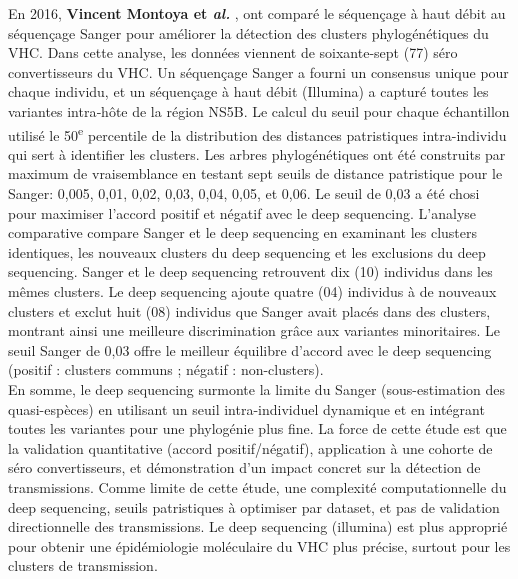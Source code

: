 \documentclass[a4paper,12pt]{article}
\begin{document}
En 2016, \textbf{Vincent Montoya et \textit{al.}} \cite{montoyaDeepSequencingIncreases2016}, ont comparé le séquençage à haut débit au séquençage Sanger pour améliorer la détection des clusters phylogénétiques du VHC. Dans cette analyse, les données viennent de soixante-sept (77) séro convertisseurs du VHC. Un séquençage Sanger a fourni un consensus unique pour chaque individu, et un séquençage à haut débit (Illumina) a capturé toutes les variantes intra‑hôte de la région NS5B. Le calcul du seuil pour chaque échantillon utilisé le 50\textsuperscript{e} percentile de la distribution des distances patristiques intra-individu qui sert à identifier les clusters. Les arbres phylogénétiques ont été construits par maximum de vraisemblance en testant sept seuils de distance patristique pour le Sanger: 0,005, 0,01, 0,02, 0,03, 0,04, 0,05, et 0,06. Le seuil de 0,03 a été chosi pour maximiser l’accord positif et négatif avec le deep sequencing. L’analyse comparative compare Sanger et le deep sequencing en examinant les clusters identiques, les nouveaux clusters du deep sequencing et les exclusions du deep sequencing. Sanger et le deep sequencing retrouvent dix (10) individus dans les mêmes clusters. Le deep sequencing ajoute quatre (04) individus à de nouveaux clusters et exclut huit (08) individus que Sanger avait placés dans des clusters, montrant ainsi une meilleure discrimination grâce aux variantes minoritaires. Le seuil Sanger de 0,03 offre le meilleur équilibre d’accord avec le deep sequencing (positif : clusters communs ; négatif : non-clusters).\\
En somme, le deep sequencing surmonte la limite du Sanger (sous-estimation des quasi-espèces) en utilisant un seuil intra-individuel dynamique et en intégrant toutes les variantes pour une phylogénie plus fine. La force de cette étude est que la validation quantitative (accord positif/négatif), application à une cohorte de séro convertisseurs, et démonstration d’un impact concret sur la détection de transmissions. Comme limite de cette étude, une complexité computationnelle du deep sequencing, seuils patristiques à optimiser par dataset, et pas de validation directionnelle des transmissions. Le deep sequencing (illumina) est plus approprié pour obtenir une épidémiologie moléculaire du VHC plus précise, surtout pour les clusters de transmission. \\
\end{document}

